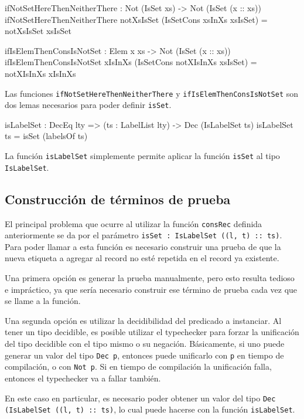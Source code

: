 \begin{code}
ifNotSetHereThenNeitherThere : Not (IsSet xs) ->
  Not (IsSet (x :: xs))
ifNotSetHereThenNeitherThere notXsIsSet
  (IsSetCons xsInXs xsIsSet) = notXsIsSet xsIsSet

ifIsElemThenConsIsNotSet : Elem x xs ->
  Not (IsSet (x :: xs))
ifIsElemThenConsIsNotSet xIsInXs
  (IsSetCons notXIsInXs xsIsSet) = notXIsInXs xIsInXs
\end{code}

Las funciones \texttt{ifNotSetHereThenNeitherThere} y \texttt{ifIsElemThenConsIsNotSet} son dos lemas necesarios para poder definir \texttt{isSet}.

\begin{code}
isLabelSet : DecEq lty => (ts : LabelList lty) ->
  Dec (IsLabelSet ts)
isLabelSet ts = isSet (labelsOf ts)
\end{code}

La función \texttt{isLabelSet} simplemente permite aplicar la función \texttt{isSet} al tipo \texttt{IsLabelSet}.

\subsection{Construcción de términos de prueba}

El principal problema que ocurre al utilizar la función \texttt{consRec} definida anteriormente se da por el parámetro \texttt{isSet : IsLabelSet ((l, t) :: ts)}. Para poder llamar a esta función es necesario construir una prueba de que la nueva etiqueta a agregar al record no esté repetida en el record ya existente.

Una primera opción es generar la prueba manualmente, pero esto resulta tedioso e impráctico, ya que sería necesario construir ese término de prueba cada vez que se llame a la función.

Una segunda opción es utilizar la decidibilidad del predicado a instanciar. Al tener un tipo decidible, es posible utilizar el typechecker para forzar la unificación del tipo decidible con el tipo mismo o su negación. Básicamente, si uno puede generar un valor del tipo \texttt{Dec p}, entonces puede unificarlo con \texttt{p} en tiempo de compilación, o con \texttt{Not p}. Si en tiempo de compilación la unificación falla, entonces el typechecker va a fallar también.

En este caso en particular, es necesario poder obtener un valor del tipo \texttt{Dec (IsLabelSet ((l, t) :: ts)}, lo cual puede hacerse con la función \texttt{isLabelSet}.

